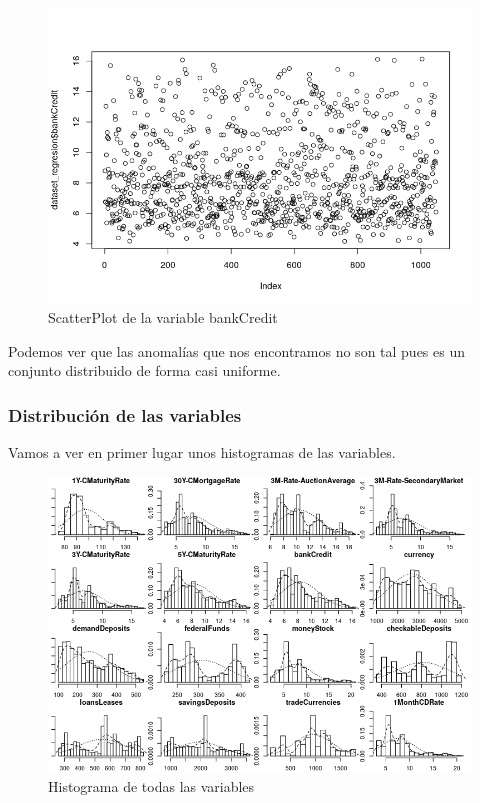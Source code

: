\documentclass[12pt,a4paper]{article}
\begin{document}
\begin{figure}[H]
	\centering
	\includegraphics[scale=0.8]{./Imagenes/EDA/Regresion/scatterplot_bankCredit.png}
	\caption{ScatterPlot de la variable bankCredit}
\end{figure}

Podemos ver que las anomalías que nos encontramos no son tal pues es un conjunto distribuido de forma casi uniforme.

\subsubsection{Distribución de las variables}

Vamos a ver en primer lugar unos histogramas de las variables.

\begin{figure}[H]
	\centering
	\includegraphics[scale=0.85]{./Imagenes/EDA/Regresion/histograma_todas.png}
	\caption{Histograma de todas las variables}
\end{figure}
\end{document}

